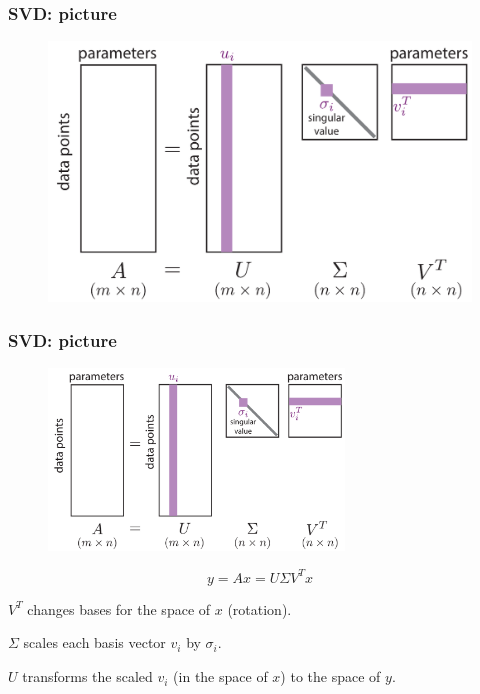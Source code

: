 \documentclass[xcolor={dvipsnames}]{beamer}
\begin{document}
\begin{frame}
\frametitle{SVD: picture}
\vspace{-0.3in}
\begin{figure}
\includegraphics[width=\textwidth]{figs/svd-components.pdf}
\end{figure}
\end{frame}

\begin{frame}
\frametitle{SVD: picture}
\vspace{-0.1in}
\begin{figure}
\includegraphics[width=0.7\textwidth]{figs/svd-components.pdf}
\end{figure}
$$y = A x = U \Sigma V^T x$$
\vspace{-0.2in}
\begin{exampleblock}{}
$V^T$ changes bases for the space of $x$ (rotation).

$\Sigma$ scales each basis vector $v_i$ by $\sigma_i$.

$U$ transforms the scaled $v_i$ (in the space of $x$) to the space of $y$.
\end{exampleblock}
\end{frame}
\end{document}
